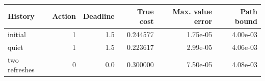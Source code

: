 \begin{tabular}{lrrrrr}
\toprule
History & Action & Deadline & True cost & Max. value error & Path bound \\
\midrule
initial & 1 & 1.5 & 0.244577 & 1.75e-05 & 4.00e-03 \\
quiet & 1 & 1.5 & 0.223617 & 2.99e-05 & 4.06e-03 \\
two refreshes & 0 & 0.0 & 0.300000 & 7.50e-05 & 4.08e-03 \\
\bottomrule
\end{tabular}
